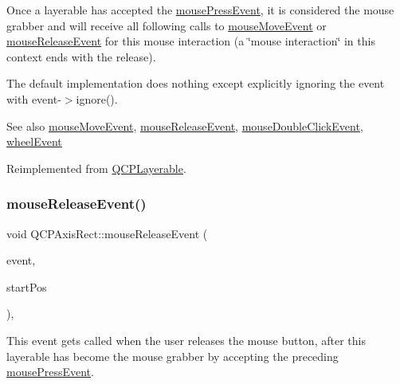 Once a layerable has accepted the \hyperlink{classQCPAxisRect_aa9a7c807eaa4666870ac94aa6abc4dde}{mouse\+Press\+Event}, it is considered the mouse grabber and will receive all following calls to \hyperlink{classQCPAxisRect_a9cd27ad8c5cfb49aefd9dbb30def4beb}{mouse\+Move\+Event} or \hyperlink{classQCPAxisRect_a6c89b988d3a0b93c0878f0ebdb5037f4}{mouse\+Release\+Event} for this mouse interaction (a \char`\"{}mouse interaction\char`\"{} in this context ends with the release).

The default implementation does nothing except explicitly ignoring the event with {\ttfamily event-\/$>$ignore()}.

\begin{DoxySeeAlso}{See also}
\hyperlink{classQCPAxisRect_a9cd27ad8c5cfb49aefd9dbb30def4beb}{mouse\+Move\+Event}, \hyperlink{classQCPAxisRect_a6c89b988d3a0b93c0878f0ebdb5037f4}{mouse\+Release\+Event}, \hyperlink{classQCPLayerable_a4171e2e823aca242dd0279f00ed2de81}{mouse\+Double\+Click\+Event}, \hyperlink{classQCPAxisRect_a93eeaa0c127d6d6fe8171b2455080262}{wheel\+Event} 
\end{DoxySeeAlso}


Reimplemented from \hyperlink{classQCPLayerable_af6567604818db90f4fd52822f8bc8376}{Q\+C\+P\+Layerable}.

\mbox{\label{classQCPAxisRect_a6c89b988d3a0b93c0878f0ebdb5037f4}} 
\subsubsection{\texorpdfstring{mouse\+Release\+Event()}{mouseReleaseEvent()}}
{\footnotesize\ttfamily void Q\+C\+P\+Axis\+Rect\+::mouse\+Release\+Event (\begin{DoxyParamCaption}\item[{Q\+Mouse\+Event $\ast$}]{event,  }\item[{const Q\+PointF \&}]{start\+Pos }\end{DoxyParamCaption})\hspace{0.3cm}{\ttfamily [protected]}, {\ttfamily [virtual]}}

This event gets called when the user releases the mouse button, after this layerable has become the mouse grabber by accepting the preceding \hyperlink{classQCPAxisRect_aa9a7c807eaa4666870ac94aa6abc4dde}{mouse\+Press\+Event}.

